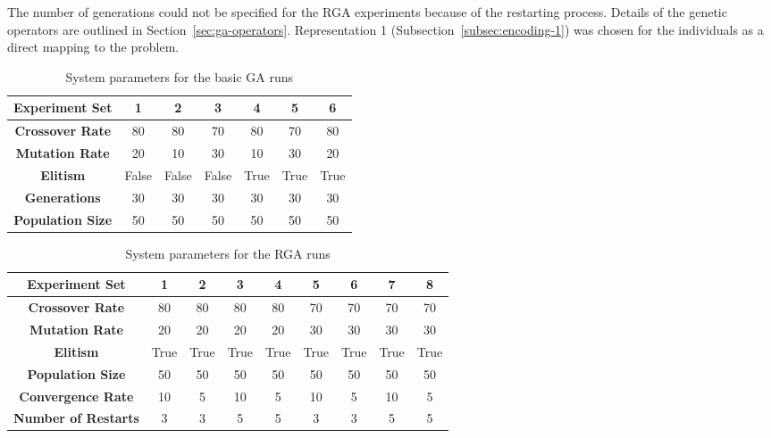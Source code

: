 The number of generations could not be specified for the RGA experiments because of the restarting process. Details of the genetic operators are outlined in Section~\ref{sec:ga-operators}. Representation 1 (Subsection~\ref{subsec:encoding-1}) was chosen for the individuals as a direct mapping to the problem. 

\begin{table}
	\centering
	\begin{tabular}{ | >{\bfseries}c | c | c | c | c | c | c | }
		\hline
		Experiment Set & 1 & 2 & 3 & 4 & 5 & 6 \\ \hline
		Crossover Rate & 80 & 80 & 70 & 80 & 70 & 80 \\ \hline
		Mutation Rate & 20 & 10 & 30 & 10 & 30 & 20 \\ \hline
		Elitism & False & False & False & True & True & True \\ \hline
		Generations & 30 & 30 & 30 & 30 & 30 & 30 \\ \hline
		Population Size & 50 & 50 & 50 & 50 & 50 & 50 \\ \hline
	\end{tabular}
	\caption{System parameters for the basic GA runs}
	\label{table:viability-ga}
\end{table}

\begin{table}
	\centering
	\begin{tabular}{ | >{\bfseries}c | c | c | c | c | c | c | c | c | }
		\hline
		Experiment Set & 1 & 2 & 3 & 4 & 5 & 6 & 7 & 8 \\ \hline
		Crossover Rate & 80 & 80 & 80 & 80 & 70 & 70 & 70 & 70 \\ \hline
		Mutation Rate & 20 & 20 & 20 & 20 & 30 & 30 & 30 & 30 \\ \hline
		Elitism & True & True & True & True & True & True & True & True \\ \hline
		Population Size & 50 & 50 & 50 & 50 & 50 & 50 & 50 & 50 \\ \hline
		Convergence Rate & 10 & 5 & 10 & 5 & 10 & 5 & 10 & 5 \\ \hline
		Number of Restarts & 3 & 3 & 5 & 5 & 3 & 3 & 5 & 5 \\ \hline
	\end{tabular}
	\caption{System parameters for the RGA runs}
	\label{table:viability-rga}
\end{table}
